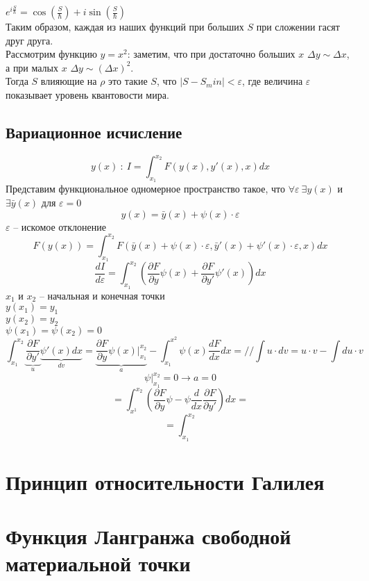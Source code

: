 \documentclass[a4paper, 12pt, titlepage, fleqn]{article}
\newcommand{\T}{\textbf}
\newcommand{\D}{\partial}
\begin{document}
			$e^{i\frac{S}{\hbar}} = \cos(\frac{S}{\hbar}) + i\sin(\frac{S}{\hbar})$\\
			
			Таким образом, каждая из наших функций при больших $S$ при сложении гасят друг друга.\\
			
			Рассмотрим функцию $y = x^2$: заметим, что при достаточно больших $x$ $\Delta y \sim \Delta x$, а при малых $x$ $\Delta y \sim (\Delta x)^2$.\\
			
			Тогда $S$ влияющие на $\rho$ это такие $S$, что $|S - S_min| < \varepsilon$, где величина $\varepsilon$ показывает уровень квантовости мира.
			
		\subsection{Вариационное исчисление}
		\[
			y(x) \: \colon\: I = \int_{x_1}^{x_2} F(y(x), y'(x), x)dx
		\] 
		Представим функциональное одномерное пространство такое, что $\forall \varepsilon\: \exists y(x)$ и $\exists \bar{y}(x)$ для $\varepsilon = 0$\\
		\[
			y(x) = \bar{y}(x) + \psi(x) \cdot \varepsilon
		\]
		$\varepsilon$ -- искомое отклонение
		\[
			F(y(x)) = \int_{x_1}^{x_2} F(\bar{y}(x) + \psi(x) \cdot \varepsilon, \bar{y}'(x) + \psi'(x) \cdot \varepsilon, x)dx
		\]
		\[
			\frac{dI}{d\varepsilon} = \int_{x_1}^{x_2}(\frac{\partial F}{\partial y}\psi(x) + \frac{\partial F}{\partial y'}\psi'(x))dx
		\]
		$x_1$ и $x_2$ -- начальная и конечная точки\\ 
		$y(x_1) = y_1$ \\
		$y(x_2) = y_2$\\
		$\psi(x_1) = \psi(x_2) = 0$
		\[
			\int_{x_1}^{x_2} \underbrace{\frac{\partial F}{\partial y'}}_u \underbrace{\psi'(x)dx}_{dv} = \underbrace{\frac{\partial F}{\partial y}\psi(x)|_{x_1}^{x_2}}_a - \int_{x_1}^{x^2} \psi(x)\frac{dF}{dx}dx = \T{//} \int u\cdot dv = u \cdot v - \int du \cdot v 
		\]
		\[
			\psi|_{x_1}^{x_2} = 0 \to a = 0 
		\]
		\[
			= \int_{x^1}^{x_2} \left(\frac{\partial F}{\D y} \psi - \psi \frac{d}{dx} \frac{\D F}{\D y'} \right)dx = 
		\]
		\[
			= \int_{x_1}^{x_2} 
		\]
	\section{Принцип относительности Галилея}
	\section{Функция Лангранжа свободной материальной точки}
\end{document}
